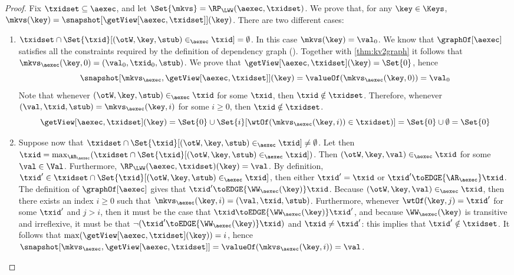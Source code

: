 \begin{proof}
Fix $\txidset \subseteq \aexec$, and let $\Set{\mkvs} = \RP_{\LWW}(\aexec, \txidset)$. We prove that, for any $\key \in \Keys$, 
$\mkvs(\key) = \snapshot[\getView[\aexec, \txidset]](\key)$. There are two different cases: 
\begin{enumerate}
    \item $\txidset \cap \Set{ \txid }[ (\otW, \key, \stub) \in_{\aexec} \txid ] = \emptyset$. 
In this case $\mkvs(\key) = \val_0$. 
We know that $\graphOf[\aexec]$ satisfies all the constraints required by the definition of dependency graph 
(\cite{laws}). Together with \cref{thm:kv2graph} it follows that $\mkvs_{\aexec}(\key, 0) = (\val_0, \txid_0, \stub)$.
We prove that $\getView[\aexec, \txidset](\key) = \Set{0}$, 
hence 
\[ 
\snapshot[\mkvs_{\aexec}, \getView[\aexec, \txidset]](\key) = \valueOf(\mkvs_{\aexec}(\key, 0)) = \val_{0}
\]
Note that whenever $(\otW, \key, \stub) \in_{\aexec} \txid$ for some $\txid$, then 
$\txid \notin \txidset$. Therefore, whenever $(\val, \txid, \stub) = \mkvs_{\aexec}(\key, i)$ for some $i \geq 0$, then 
$\txid \notin \txidset$.
\[
\getView[\aexec, \txidset](\key) = \Set{0} \cup \Set{i }[ \wtOf(\mkvs_{\aexec}(\key, i)) \in \txidset)] = \Set{0} \cup \emptyset = \Set{0}
\]
\item Suppose now that $\txidset \cap \Set{ \txid }[ (\otW, \key, \stub) \in_{\aexec} \txid ] \neq \emptyset$. 
Let then $\txid = \max_{\AR_{\aexec}}(\txidset \cap \Set{\txid }[ (\otW, \key, \stub) \in_{\aexec} \txid])$. 
Then $(\otW, \key, \val) \in_{\aexec} \txid$ for some $\val \in \Val$. Furthermore, $\RP_{\LWW}(\aexec, \txidset)(\key) = \val$.
By definition, $\txid' \in \txidset \cap \Set{ \txid }[ (\otW, \key, \stub) \in_{\aexec} \txid]$, 
then either $\txid' = \txid$ or $\txid' \toEDGE{\AR_{\aexec}} \txid$. The definition of 
$\graphOf[\aexec]$ gives that $\txid' \toEDGE{\WW_{\aexec}(\key)} \txid$. 
Because $(\otW, \key, \val) \in_{\aexec} \txid$, then there exists an index 
$i \geq 0$ such that $\mkvs_{\aexec}(\key, i) = (\val, \txid, \stub)$. Furthermore, 
whenever $\wtOf(\key, j) = \txid'$ for some $\txid'$ and $j > i$, then it must 
be the case that $\txid \toEDGE{\WW_{\aexec}(\key)} \txid'$, and because 
$\WW_{\aexec}(\key)$ is transitive and irreflexive, it must be that  
$\neg( \txid' \toEDGE{\WW_{\aexec}(\key)} \txid)$ and $\txid \neq \txid'$: this implies that 
$\txid' \notin \txidset$. It follows that $\max(\getView[\aexec, \txidset](\key)) = i$, hence 
$\snapshot[\mkvs_{\aexec}, \getView[\aexec, \txidset]] = \valueOf(\mkvs_{\aexec}(\key, i)) = \val$.
\end{enumerate}
\end{proof}

